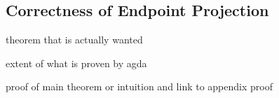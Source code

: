 \subsection{Correctness of Endpoint Projection}
\label{sec:proj-correct}
\todo theorem that is actually wanted

\todo extent of what is proven by agda

\todo proof of main theorem or intuition and link to appendix proof

